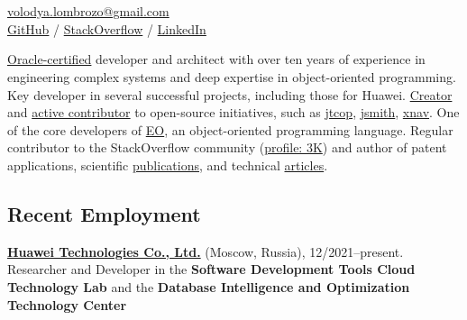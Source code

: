 \documentclass{vl}
\begin{document}
    \vlPrintPhoto{}

    \section*{\Large {}}

    \href{mailto:volodya.lombrozo@gmail.com}{volodya.lombrozo@gmail.com}\\%
    \href{https://github.com/volodya-lombrozo}{GitHub} /
    \href{https://stackoverflow.com/users/10423604/volodya-lombrozo}{StackOverflow} /
    \href{https://www.linkedin.com/in/vladimir-zakharov-lombrozo-b71744216/}{LinkedIn}

    \vspace*{24pt}

    \href{https://catalog-education.oracle.com/pls/certview/sharebadge?id=87F6A2FE819A5A5AF4120A05900AB28A461EE9A3EE9FBFA02721FADAEB3BCE19}{Oracle-certified}
    developer and architect with over ten years of experience in engineering complex systems
    and deep expertise in object-oriented programming.
    Key developer in several successful projects, including those for Huawei.
    \href{https://github.com/volodya-lombrozo?tab=repositories}{Creator} and
    \href{https://github.com/volodya-lombrozo}{active contributor} to open-source initiatives, such as
    \href{https://github.com/volodya-lombrozo/jtcop}{jtcop},
    \href{https://github.com/volodya-lombrozo/jsmith}{jsmith},
    \href{https://github.com/volodya-lombrozo/xnav}{xnav}.
    One of the core developers of \href{https://www.eolang.org}{EO}, an object-oriented programming language.
    Regular contributor to the StackOverflow community
    (\href{https://stackoverflow.com/users/10423604/volodya-lombrozo}{profile: 3K}) and
    author of patent applications, scientific \href{https://arxiv.org/abs/2410.05631}{publications}, and technical
    \href{https://dzone.com/users/4993224/volodya-lombrozo.html}{articles}.

    \subsection*{Recent Employment}

    \textbf{\href{https://www.huawei.com}{Huawei Technologies Co., Ltd.}} (Moscow, Russia), 12/2021--present.
    Researcher and Developer in the \textbf{Software Development Tools Cloud Technology Lab} and the
    \textbf{Database Intelligence and Optimization Technology Center}
\end{document}
